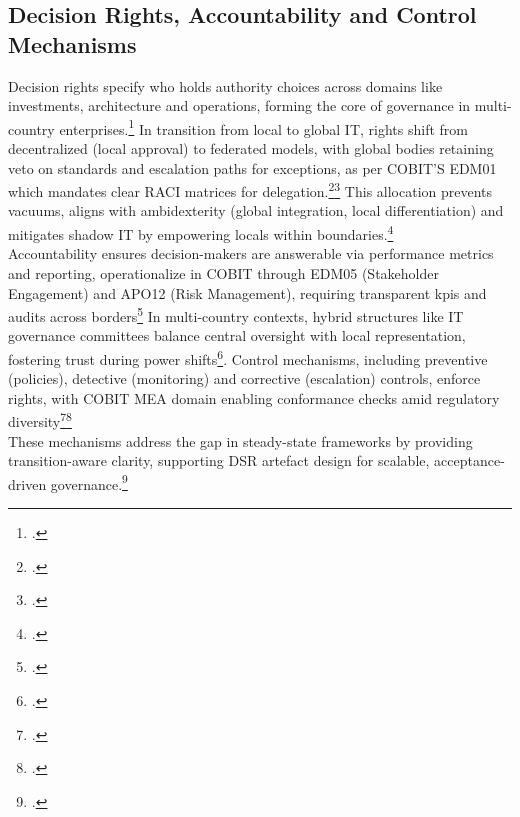 \subsection{Decision Rights, Accountability and Control Mechanisms}
\label{subsec:DecisionRightsAccountabilityControlMechanisms}
Decision rights specify who holds authority choices across domains like investments, architecture and operations, forming the core of governance in multi-country enterprises.\footcite[10-11]{weillITGovernanceHow2004}
In transition from local to global IT, rights shift from decentralized (local approval) to federated models, with global bodies retaining veto on standards and escalation paths for exceptions, as per COBIT'S EDM01 which mandates clear \Gls{RACI} matrices for delegation.\footcite[33]{isacaCOBIT2019Framework2018a}\footcite[5-6]{ionitaITGovernanceGlobal2009}
This allocation prevents vacuums, aligns with ambidexterity (global integration, local differentiation) and mitigates shadow IT by empowering locals within boundaries.\footcite[9]{emryITGovernanceGuide2024}
\\
Accountability ensures decision-makers are answerable via performance metrics and reporting, operationalize in COBIT through EDM05 (Stakeholder Engagement) and APO12 (Risk Management), requiring transparent \ac{kpi}s and audits across borders\footcite[33]{isacaCOBIT2019Framework2018}
In multi-country contexts, hybrid structures like IT governance committees balance central oversight with local representation, fostering trust during power shifts\footcite[7-8]{emryITGovernanceGuide2024}.
Control mechanisms, including preventive (policies), detective (monitoring) and corrective (escalation) controls, enforce rights, with COBIT \Gls{MEA} domain enabling conformance checks amid regulatory diversity\footcite[271-297]{isacaCOBIT2019Framework2018a}\footcite[1395]{iloriComprehensiveReviewIt2024}
\\
These mechanisms address the gap in steady-state frameworks by providing transition-aware clarity, supporting \ac{DSR} artefact design for scalable, acceptance-driven governance.\footcite[75-77]{hevnerDesignScienceResearch2004}